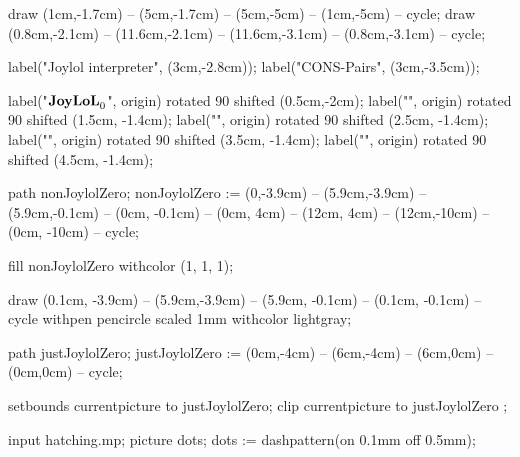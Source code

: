 draw (1cm,-1.7cm) -- (5cm,-1.7cm) -- (5cm,-5cm) -- (1cm,-5cm) -- cycle;
draw (0.8cm,-2.1cm) -- (11.6cm,-2.1cm) -- (11.6cm,-3.1cm) -- (0.8cm,-3.1cm) -- cycle;


label("Joylol interpreter", (3cm,-2.8cm));
label("CONS-Pairs", (3cm,-3.5cm));

label("$\bold{JoyLoL}_0$", origin) rotated 90 shifted (0.5cm,-2cm);
label("", origin) rotated 90 shifted (1.5cm, -1.4cm);
label("", origin) rotated 90 shifted (2.5cm, -1.4cm);
label("", origin) rotated 90 shifted (3.5cm, -1.4cm);
label("", origin) rotated 90 shifted (4.5cm, -1.4cm);


path nonJoylolZero;
nonJoylolZero := (0,-3.9cm) -- (5.9cm,-3.9cm) --
  (5.9cm,-0.1cm) -- (0cm, -0.1cm) -- (0cm, 4cm) -- (12cm, 4cm) --
  (12cm,-10cm) -- (0cm, -10cm) -- cycle;

fill nonJoylolZero withcolor (1, 1, 1);

draw (0.1cm, -3.9cm) -- (5.9cm,-3.9cm) -- (5.9cm, -0.1cm) -- (0.1cm, -0.1cm) -- cycle
  withpen pencircle scaled 1mm
  withcolor lightgray;
  
path justJoylolZero;
justJoylolZero := (0cm,-4cm) -- (6cm,-4cm) -- (6cm,0cm) -- (0cm,0cm) -- cycle;

setbounds currentpicture to justJoylolZero;
clip currentpicture to justJoylolZero ;
\stopMPcode\egroup

\bgroup\startMPcode
input hatching.mp;
picture dots; dots := dashpattern(on 0.1mm off 0.5mm);

